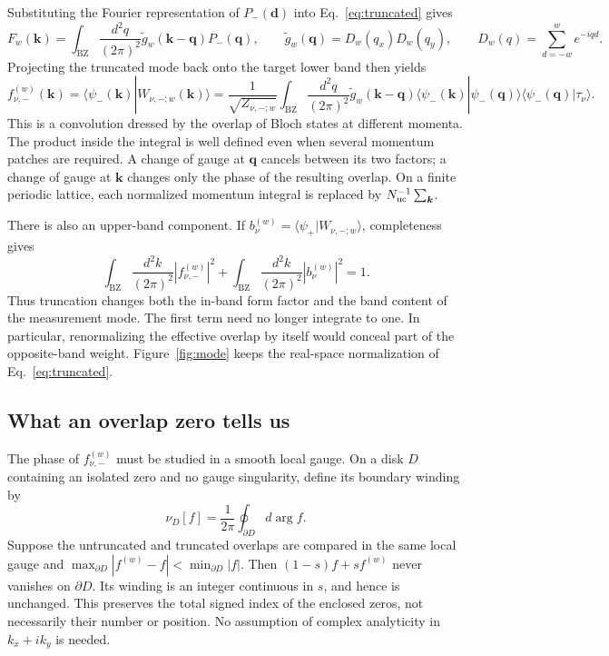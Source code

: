 \documentclass[aps,prb,onecolumn,nofootinbib,superscriptaddress]{revtex4-2}
\newcommand{\bk}{\boldsymbol k}
\newcommand{\bd}{\boldsymbol d}
\newcommand{\bq}{\boldsymbol q}
\newcommand{\intk}{\int_{\mathrm{BZ}}\frac{d^2k}{(2\pi)^2}}
\newcommand{\intq}{\int_{\mathrm{BZ}}\frac{d^2q}{(2\pi)^2}}
\begin{document}
Substituting the Fourier representation of $P_-(\bd)$ into
Eq.~\eqref{eq:truncated} gives
\begin{equation}
 F_w(\bk)=\intq\widetilde g_w(\bk-\bq)P_-(\bq),\qquad
 \widetilde g_w(\bq)=D_w(q_x)D_w(q_y),\qquad
 D_w(q)=\sum_{d=-w}^{w}e^{-iqd}.
 \label{eq:convolution}
\end{equation}
Projecting the truncated mode back onto the target lower band then yields
\begin{equation}
 f^{(w)}_{\nu,-}(\bk)
 =\langle\psi_-(\bk)|W_{\nu,-;w}(\bk)\rangle
 =\frac{1}{\sqrt{Z_{\nu,-;w}}}\intq\widetilde g_w(\bk-\bq)
 \langle\psi_-(\bk)|\psi_-(\bq)\rangle
 \langle\psi_-(\bq)|\tau_\nu\rangle.
 \label{eq:feff}
\end{equation}
This is a convolution dressed by the overlap of Bloch states at different
momenta. The product inside the integral is well defined even when several
momentum patches are required. A change of gauge at $\bq$ cancels between its
two factors; a change of gauge at $\bk$ changes only the phase of the resulting
overlap. On a finite periodic lattice, each normalized momentum integral is
replaced by $N_{\rm uc}^{-1}\sum_{\bk}$.

There is also an upper-band component. If
$b^{(w)}_\nu=\langle\psi_+|W_{\nu,-;w}\rangle$, completeness gives
\begin{equation}
 \intk|f^{(w)}_{\nu,-}|^2+\intk|b^{(w)}_\nu|^2=1.
 \label{eq:leakage}
\end{equation}
Thus truncation changes both the in-band form factor and the band content of
the measurement mode. The first term need no longer integrate to one. In
particular, renormalizing the effective overlap by itself would conceal part
of the opposite-band weight. Figure~\ref{fig:mode} keeps the real-space
normalization of Eq.~\eqref{eq:truncated}.

\subsection{What an overlap zero tells us}

The phase of $f^{(w)}_{\nu,-}$ must be studied in a smooth local gauge. On a
disk $D$ containing an isolated zero and no gauge singularity, define its
boundary winding by
\begin{equation}
 \nu_D[f]=\frac{1}{2\pi}\oint_{\partial D}d\arg f.
 \label{eq:winding}
\end{equation}
Suppose the untruncated and truncated overlaps are compared in the same local
gauge and
$\max_{\partial D}|f^{(w)}-f|<\min_{\partial D}|f|$.
Then $(1-s)f+sf^{(w)}$ never vanishes on $\partial D$. Its winding is an
integer continuous in $s$, and hence is unchanged. This preserves the total
signed index of the enclosed zeros, not necessarily their number or position.
No assumption of complex analyticity in $k_x+ik_y$ is needed.
\end{document}
